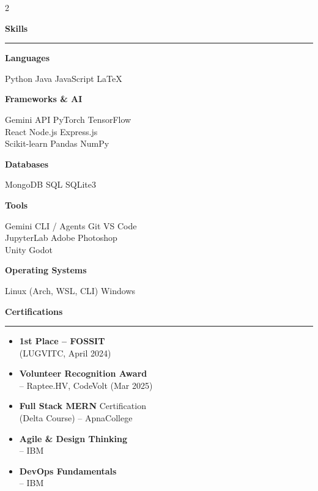 \documentclass[10pt, a4paper]{article}
\newcommand{\skilllabel}[1]{%
  {\small\bfseries\color{accentlight} #1}\par\vspace{1pt}%
}
\newcommand{\skillval}[1]{%
  {\footnotesize\color{mwhite} #1}\par\vspace{5pt}%
}
\newcommand{\leftsection}[1]{%
  \vspace{8pt}%
  {\color{accent}\large\bfseries #1}\\[-2pt]%
  {\color{accent}\rule{\linewidth}{1pt}}\par\vspace{4pt}%
}
\begin{document}
\begin{paracol}{2}
\begin{leftcolumn}
\begin{minipage}[t]{\dimexpr\linewidth-16pt}
  \vspace{10pt}

  \leftsection{Skills}

  \skilllabel{Languages}
  \skillval{Python \textbullet{} Java \textbullet{} JavaScript \textbullet{} LaTeX}
  \vspace{2pt}
  \skilllabel{Frameworks \& AI}
  \skillval{Gemini API \textbullet{} PyTorch \textbullet{} TensorFlow \textbullet{} \\React \textbullet{} Node.js \textbullet{} Express.js \textbullet{} \\Scikit-learn \textbullet{} Pandas \textbullet{} NumPy}
  \vspace{2pt}
  \skilllabel{Databases}
  \skillval{MongoDB \textbullet{} SQL \textbullet{} SQLite3}
  \vspace{2pt}
  \skilllabel{Tools}
  \skillval{Gemini CLI / Agents \textbullet{} Git \textbullet{} VS Code \textbullet{} \\JupyterLab \textbullet{} Adobe Photoshop \textbullet{} \\Unity \textbullet{} Godot}
  \vspace{2pt}
  \skilllabel{Operating Systems}
  \skillval{Linux (Arch, WSL, CLI) \textbullet{} Windows}

  \vspace{8pt}


  \leftsection{Certifications}

  {\footnotesize\color{mwhite}
  \begin{itemize}[leftmargin=1.1em, itemsep=4pt, topsep=2pt, parsep=0pt]
    \item[\color{accent}\textbullet] \textbf{1st Place -- FOSSIT}\\(LUGVITC, April 2024)
    \item[\color{accent}\textbullet] \textbf{Volunteer Recognition Award}\\-- Raptee.HV, CodeVolt (Mar 2025)
    \item[\color{accent}\textbullet] \textbf{Full Stack MERN} Certification\\(Delta Course) -- ApnaCollege
    \item[\color{accent}\textbullet] \textbf{Agile \& Design Thinking}\\-- IBM
    \item[\color{accent}\textbullet] \textbf{DevOps Fundamentals}\\-- IBM
  \end{itemize}
  }


\end{minipage}
\end{leftcolumn}
\end{paracol}
\end{document}
